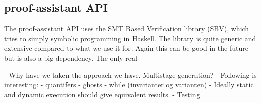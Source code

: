 \subsection{proof-assistant API}
The proof-assistant API uses the SMT Based Verification library (SBV), which tries to simply symbolic programming in Haskell. The library is quite generic and extensive compared to what we use it for. Again this can be good in the future but is also a big dependency. The only real


- Why have we taken the approach we have. Multistage generation?
- Following is interesting:
  - quantifers
  - ghosts
  - while (invarianter og varianten)
- Ideally static and dynamic execution should give equivalent results.
- Testing
